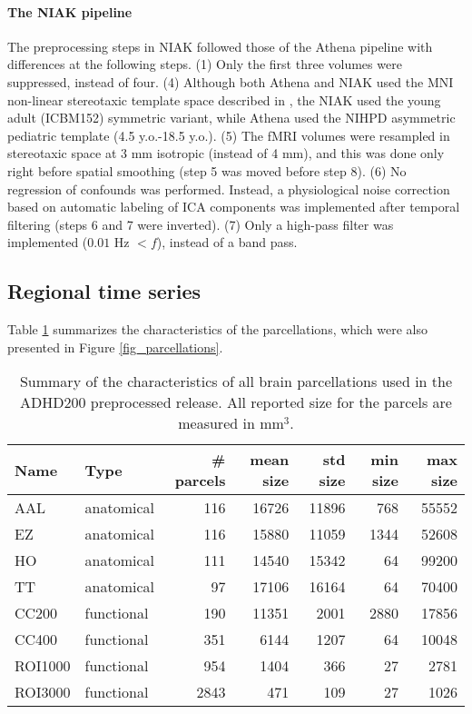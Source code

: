 \documentclass[preprint,12pt,5p]{elsarticle}
\begin{document}
\begin{itemize}
\paragraph{The NIAK pipeline} The preprocessing steps in NIAK followed those of the Athena pipeline with differences at the following steps. (1) Only the first three volumes were suppressed, instead of four. (4) Although both Athena and NIAK used the MNI non-linear stereotaxic template space described in \citep{fonov2011unbiased}, the NIAK used the young adult (ICBM152) symmetric variant, while Athena used the NIHPD asymmetric pediatric template (4.5 y.o.-18.5 y.o.). (5) The fMRI volumes were resampled in stereotaxic space at 3 mm isotropic (instead of 4 mm), and this was done only right before spatial smoothing (step 5 was moved before step 8). (6) No regression of confounds was performed. Instead, a physiological noise correction based on automatic labeling of ICA components was implemented \citep{perlbarg2007corsica} after temporal filtering (steps 6 and 7 were inverted). (7) Only a high-pass filter was implemented ($0.01$ Hz $< f$), instead of a band pass. 

\subsection{Regional time series}
Table \ref{tab_parcellations} summarizes the characteristics of the parcellations, which were also presented in Figure \ref{fig_parcellations}. 
\begin{table}[htbp]
\label{tab_parcellations}
\caption{Summary of the characteristics of all brain parcellations used in the ADHD200 preprocessed release. All reported size for the parcels are measured in mm$^3$.}
\begin{tabular}{llrrrrr}
Name & Type & \# parcels & mean size & std size & min size & max size \\
\hline
AAL	    & anatomical &  116 &  16726 & 11896 &  768 & 55552\\
EZ	    & anatomical &  116 &  15880 & 11059 & 1344 & 52608\\
HO	    & anatomical &  111 &  14540 & 15342 &   64 & 99200\\
TT	    & anatomical & 	 97 &  17106 & 16164 &   64 & 70400\\
CC200   & functional &  190 &  11351 &  2001 & 2880 & 17856\\
CC400   & functional &  351 &   6144 &  1207 &   64 & 10048\\
ROI1000 & functional &  954 &   1404 &   366 &   27 & 2781\\
ROI3000	& functional & 2843	&    471 &   109 &   27 & 1026\\
\end{tabular}
\end{table}


\end{itemize}
\end{document}
